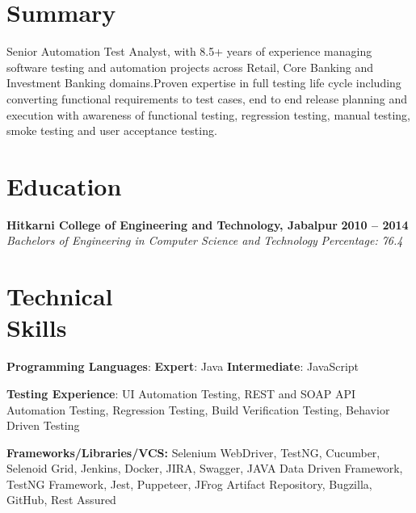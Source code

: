 \documentclass[margin,line]{resume}
\begin{document}
  \address{mobile: +91-9930145225 \\ email: yadavpriyta@gmail.com}
\begin{resume}

    \section{\mysidestyle Summary}
    Senior Automation Test Analyst, with 8.5+ years of experience managing software testing and automation projects across Retail, Core Banking and Investment Banking domains.Proven expertise in full testing life cycle including converting functional requirements to test cases, end to end release planning and execution with awareness of functional testing, regression testing, manual testing, smoke testing and user acceptance testing.   
    \section{\mysidestyle Education}

    \textbf{Hitkarni College of Engineering and Technology, Jabalpur} \hfill \textbf{2010 -- 2014}\vspace{0mm}\\\vspace{0mm}%
    \textsl{Bachelors of Engineering in Computer Science and Technology} \hfill \textsl{Percentage: 76.4}
    \section{\mysidestyle Technical \\ Skills}
    \vspace{0mm}
     \textbf{Programming Languages}: \textbf{Expert}: Java \textbf{Intermediate}: JavaScript
     
     \textbf{Testing Experience}: UI Automation Testing, REST and SOAP API Automation Testing, Regression Testing, Build Verification Testing, Behavior Driven Testing
      
      \textbf{Frameworks/Libraries/VCS:} Selenium WebDriver, TestNG, Cucumber, Selenoid Grid, Jenkins, Docker, JIRA, Swagger, JAVA Data Driven Framework, TestNG Framework, Jest, Puppeteer, JFrog Artifact Repository, Bugzilla, GitHub, Rest Assured
 

\end{resume}
\end{document}
